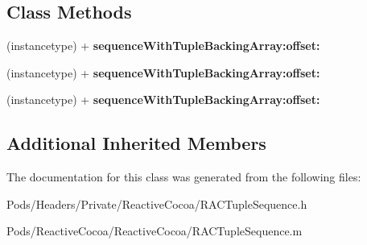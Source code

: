 \subsection*{Class Methods}
\begin{DoxyCompactItemize}
\item 
\mbox{\label{interface_r_a_c_tuple_sequence_aad505851bbc0d915bd2a2825dad37599}} 
(instancetype) + {\bfseries sequence\+With\+Tuple\+Backing\+Array\+:offset\+:}
\item 
\mbox{\label{interface_r_a_c_tuple_sequence_aad505851bbc0d915bd2a2825dad37599}} 
(instancetype) + {\bfseries sequence\+With\+Tuple\+Backing\+Array\+:offset\+:}
\item 
\mbox{\label{interface_r_a_c_tuple_sequence_aad505851bbc0d915bd2a2825dad37599}} 
(instancetype) + {\bfseries sequence\+With\+Tuple\+Backing\+Array\+:offset\+:}
\end{DoxyCompactItemize}
\subsection*{Additional Inherited Members}


The documentation for this class was generated from the following files\+:\begin{DoxyCompactItemize}
\item 
Pods/\+Headers/\+Private/\+Reactive\+Cocoa/R\+A\+C\+Tuple\+Sequence.\+h\item 
Pods/\+Reactive\+Cocoa/\+Reactive\+Cocoa/R\+A\+C\+Tuple\+Sequence.\+m\end{DoxyCompactItemize}
